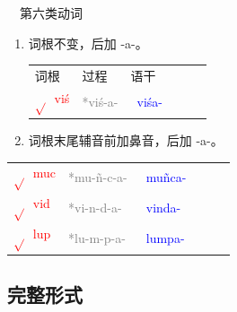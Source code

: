 \documentclass[17pt]{beamer}
\newcommand{\skt}[1]{{\sanskritfont{#1}}} %
\newcommand{\verbroot}[1]{\textcolor{red}{$\sqrt{}$#1}}
\newcommand{\sktroot}[1]{{\verbroot{\skt{#1}}}}
\newcommand{\skttransroot}[1]{{\sktroot{#1}~\textcolor{red}{#1}}}
\newcommand{\verbstem}[1]{\textcolor{blue}{#1\nobreakdash-}}
\newcommand{\sktverbstem}[1]{{\textcolor{blue}{\skt{#1\nobreakdash-}}}}
\newcommand{\skttransverbstem}[1]{{\sktverbstem{#1}~\verbstem{#1}}}
\newcommand{\reconstruction}[1]{\textcolor{gray}{*#1}}
\begin{document}
\begin{frame}{\insertsubsection ~~第六类动词}
  \small
  \begin{enumerate}
    \item
      词根不变，后加 \nobreakdash-a\nobreakdash-。

      \begin{tabular}{@{}llllll@{}} %
        词根 & 过程 & 语干  \\
        \skttransroot{viś} & \reconstruction{viś-a-} & \skttransverbstem{viśa}  \\
      \end{tabular}
   
    \item
      词根末尾辅音前加鼻音，后加 \nobreakdash-a\nobreakdash-。
  \end{enumerate} 

  \centering
  \begin{tabular}{@{}llllll@{}} %
    \skttransroot{muc} & \textcolor{gray}{*mu-ñ-c-a-} & \skttransverbstem{muñca}  \\
    \skttransroot{vid} & \textcolor{gray}{*vi-n-d-a-} & \skttransverbstem{vinda}  \\
    \skttransroot{lup} & \textcolor{gray}{*lu-m-p-a-} & \skttransverbstem{lumpa}  \\
  \end{tabular}

\end{frame}

\subsection{完整形式}
\end{document}
